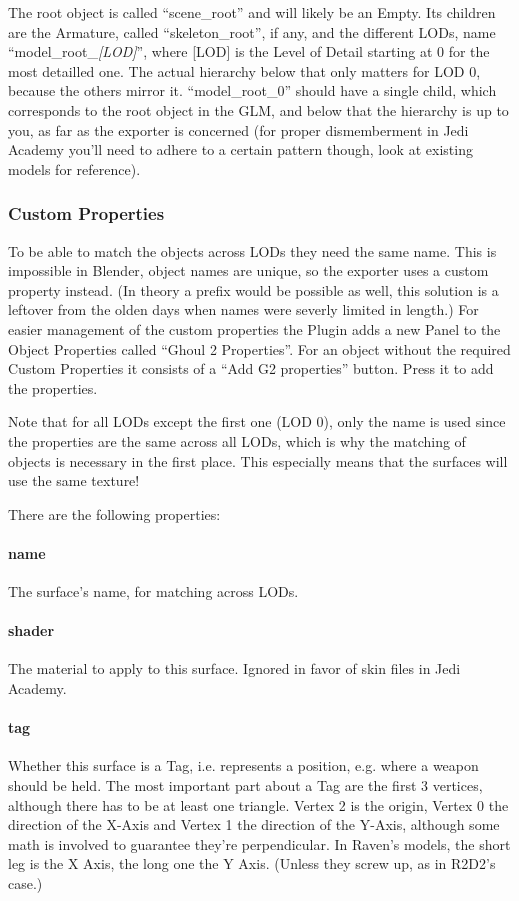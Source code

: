 \documentclass[a4paper,10pt]{article}
\begin{document}
 The root object is called ``scene\_root'' and will likely be an Empty. Its children are the Armature, called
 ``skeleton\_root'', if any, and the different LODs, name ``model\_root\_\emph{[LOD]}'', where [LOD] is the Level
 of Detail starting at 0 for the most detailled one. The actual hierarchy below that only matters for LOD 0,
 because the others mirror it. ``model\_root\_0'' should have a single child, which corresponds to the root
 object in the GLM, and below that the hierarchy is up to you, as far as the exporter is concerned (for proper
 dismemberment in Jedi Academy you'll need to adhere to a certain pattern though, look at existing  models
 for reference).
 
 \subsubsection{Custom Properties}
 
 To be able to match the objects across LODs they need the same name. This is impossible in Blender, object
 names are unique, so the exporter uses a custom property instead. (In theory a prefix would be possible as
 well, this solution is a leftover from the olden days when names were severly limited in length.) For easier
 management of the custom properties the Plugin adds a new Panel to the Object Properties called ``Ghoul 2
 Properties''. For an object without the required Custom Properties it consists of a ``Add G2 properties'' button.
 Press it to add the properties.
 
 Note that for all LODs except the first one (LOD 0), only the name is used since the properties are
 the same across all LODs, which is why the matching of objects is necessary in the first place. This
 especially means that the surfaces will use the same texture!
 
 There are the following properties:
 
 \paragraph*{name}
 The surface's name, for matching across LODs.
 
 \paragraph*{shader}
 The material to apply to this surface. Ignored in favor of skin files in Jedi Academy.
 
 \paragraph*{tag}
 Whether this surface is a Tag, i.e. represents a position, e.g. where a weapon should be held. The most
 important part about a Tag are the first 3 vertices, although there has to be at least one triangle. Vertex 2
 is the origin, Vertex 0 the direction of the X-Axis and Vertex 1 the direction of the Y-Axis, although some
 math is involved to guarantee they're perpendicular. In Raven's models, the short leg is the X Axis, the
 long one the Y Axis. (Unless they screw up, as in R2D2's case.)
 
\end{document}
